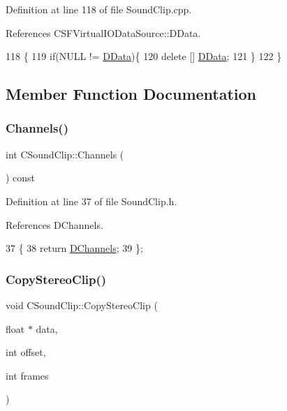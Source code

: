 Definition at line 118 of file Sound\+Clip.\+cpp.



References C\+S\+F\+Virtual\+I\+O\+Data\+Source\+::\+D\+Data.


\begin{DoxyCode}
118                        \{
119     \textcolor{keywordflow}{if}(NULL != \hyperlink{classCSoundClip_a220921a0c81e5c63e2cd3c55c75878b1}{DData})\{
120         \textcolor{keyword}{delete} [] \hyperlink{classCSoundClip_a220921a0c81e5c63e2cd3c55c75878b1}{DData};   
121     \}
122 \}
\end{DoxyCode}


\subsection{Member Function Documentation}
\hypertarget{classCSoundClip_acd59c59e307ae3e251a9b40c752fe467}{}\label{classCSoundClip_acd59c59e307ae3e251a9b40c752fe467} 
\subsubsection{\texorpdfstring{Channels()}{Channels()}}
{\footnotesize\ttfamily int C\+Sound\+Clip\+::\+Channels (\begin{DoxyParamCaption}{ }\end{DoxyParamCaption}) const\hspace{0.3cm}{\ttfamily [inline]}}



Definition at line 37 of file Sound\+Clip.\+h.



References D\+Channels.


\begin{DoxyCode}
37                             \{
38             \textcolor{keywordflow}{return} \hyperlink{classCSoundClip_a01aaf0b87b9b8226c77a6931d03d6a64}{DChannels};  
39         \};
\end{DoxyCode}
\hypertarget{classCSoundClip_a9cc8dd683c638331b2d0532aa68149da}{}\label{classCSoundClip_a9cc8dd683c638331b2d0532aa68149da} 
\subsubsection{\texorpdfstring{Copy\+Stereo\+Clip()}{CopyStereoClip()}}
{\footnotesize\ttfamily void C\+Sound\+Clip\+::\+Copy\+Stereo\+Clip (\begin{DoxyParamCaption}\item[{float $\ast$}]{data,  }\item[{int}]{offset,  }\item[{int}]{frames }\end{DoxyParamCaption})}




